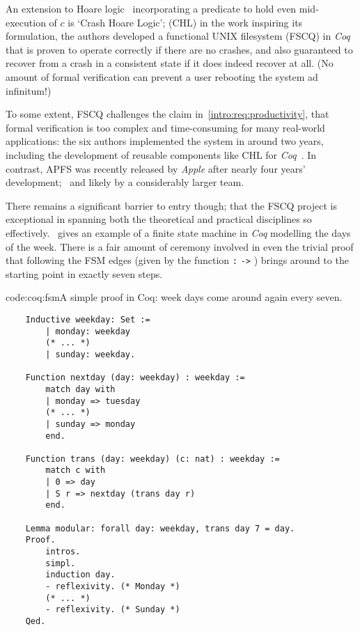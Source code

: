 An extension to Hoare logic~ incorporating a predicate to hold even mid-execution of $c$ is `Crash Hoare Logic'; (CHL) in the work inspiring its formulation, the authors developed a functional UNIX filesystem (FSCQ) in \emph{Coq} that is proven to operate correctly if there are no crashes, and also guaranteed to recover from a crash in a consistent state if it does indeed recover at all. \cite{fscq} (No amount of formal verification can prevent a user rebooting the system ad infinitum!)

To some extent, FSCQ challenges the claim in~\cref{intro:req:productivity}, that formal verification is too complex and time-consuming for many real-world applications: the six authors implemented the system in around two years, including the development of reusable components like CHL for \emph{Coq}~\cite{fscq}. In contrast, APFS was recently released by \emph{Apple} after nearly four years' development;~\cite{apfs_detail} and likely by a considerably larger team.

There remains a significant barrier to entry though; that the FSCQ project is exceptional in spanning both the theoretical and practical disciplines so effectively.~\cite{soft_eng_possible}  gives an example of a finite state machine in \emph{Coq} modelling the days of the week. There is a fair amount of ceremony involved in even the trivial proof that following the FSM edges (given by the function \texttt{:}  \texttt{->} ) brings around to the starting point in exactly seven steps.

\begin{codelisting}{code:coq:fsm}{A simple proof in Coq: week days come around again every seven.}
\begin{spacing}{\codespacing}
\begin{verbatim}
    Inductive weekday: Set :=
        | monday: weekday
        (* ... *)
        | sunday: weekday.
    
    Function nextday (day: weekday) : weekday :=
        match day with
        | monday => tuesday
        (* ... *)
        | sunday => monday
        end.
    
    Function trans (day: weekday) (c: nat) : weekday :=
        match c with
        | 0 => day
        | S r => nextday (trans day r)
        end.
    
    Lemma modular: forall day: weekday, trans day 7 = day.
    Proof.
        intros.
        simpl.
        induction day.
        - reflexivity. (* Monday *)
        (* ... *)
        - reflexivity. (* Sunday *)
    Qed.
\end{verbatim}
\end{spacing}
\end{codelisting}

